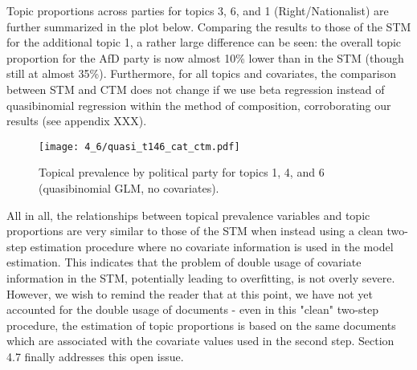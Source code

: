 \documentclass[12pt]{article}
\begin{document}
Topic proportions across parties for topics 3, 6, and 1 (Right/Nationalist) are further summarized in the plot below. Comparing the results to those of the STM for the additional topic 1, a rather large difference can be seen: the overall topic proportion for the AfD party is now almost 10\% lower than in the STM (though still at almost 35\%). Furthermore, for all topics and covariates, the comparison between STM and CTM does not change if we use beta regression instead of quasibinomial regression within the method of composition, corroborating our results (see appendix XXX).

\begin{figure}[h!]
  \centering
  \captionsetup{justification=centering,margin=2cm}
  \texttt{[image: 4\_6/quasi\_t146\_cat\_ctm.pdf]}
  \caption{Topical prevalence by political party for topics 1, 4, and 6 (quasibinomial GLM, no covariates).}
  \label{fig:quasi_t146_cat_ctm}
\end{figure}

All in all, the relationships between topical prevalence variables and topic proportions are very similar to those of the STM when instead using a clean two-step estimation procedure where no covariate information is used in the model estimation. This indicates that the problem of double usage of covariate information in the STM, potentially leading to overfitting, is not overly severe. However, we wish to remind the reader that at this point, we have not yet accounted for the double usage of documents - even in this "clean" two-step procedure, the estimation of topic proportions is based on the same documents which are associated with the covariate values used in the second step. Section 4.7 finally addresses this open issue.




\end{document}
